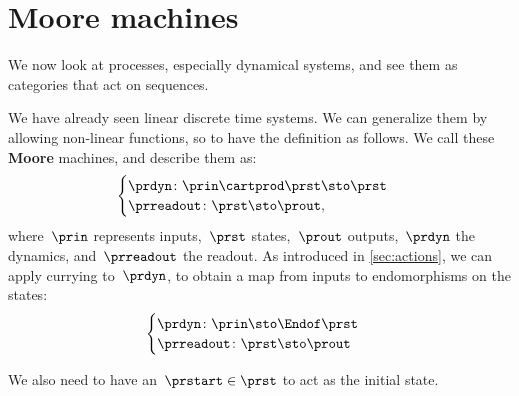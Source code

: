 

\section{Moore machines}
\label{sec:moore-machines}


We now look at processes, especially dynamical systems, and see them as categories that act on sequences.

We have already seen linear discrete time systems. We can generalize them by allowing non-linear functions, so to have
the definition as follows. We call these \textbf{Moore} machines, and describe them as:
\begin{equation}
    \label{eq:moore-1}
    \begin{cases}
        \prdyn \colon \prin \cartprod \prst \sto \prst \\
        \prreadout \colon \prst \sto \prout,
    \end{cases}
\end{equation}
where~$\prin$ represents inputs,~$\prst$ states,~$\prout$ outputs,~$\prdyn$ the dynamics, and~$\prreadout$ the readout.
As introduced in \cref{sec:actions}, we can apply currying to~$\prdyn$, to obtain a map from inputs to endomorphisms on the states:
\begin{equation}
    \label{eq:moore-1-endo}
    \begin{cases}
        \prdyn \colon \prin \sto \Endof \prst \\
        \prreadout \colon \prst \sto \prout
    \end{cases}
\end{equation}


We also need to have an~$\prstart \in \prst$ to act as the initial state.


